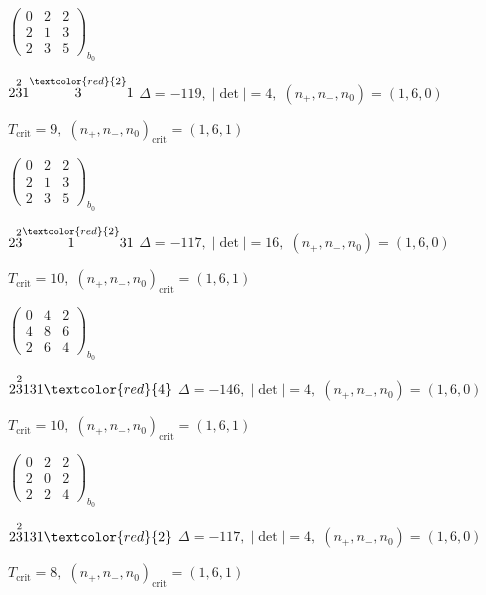 \documentclass[10pt]{article}
\begin{document}
\hspace{2em}$\left(\begin{smallmatrix}0 & 2 & 2 \\ 2 & 1 & 3 \\ 2 & 3 & 5\end{smallmatrix}\right)_{\!b_0}$

\smallskip

$2\overset{2}{3}1\overset{\textcolor{red}{2}}{3}1$ \quad $\Delta=-119,\; |\det|=4,\; (n_+,n_-,n_0)=(1,6,0)$

\hspace{1em}$T_{\text{crit}}=9,\; (n_+,n_-,n_0)_{\text{crit}}=(1,6,1)$

\hspace{2em}$\left(\begin{smallmatrix}0 & 2 & 2 \\ 2 & 1 & 3 \\ 2 & 3 & 5\end{smallmatrix}\right)_{\!b_0}$

$2\overset{2}{3}\overset{\textcolor{red}{2}}{1}31$ \quad $\Delta=-117,\; |\det|=16,\; (n_+,n_-,n_0)=(1,6,0)$

\hspace{1em}$T_{\text{crit}}=10,\; (n_+,n_-,n_0)_{\text{crit}}=(1,6,1)$

\hspace{2em}$\left(\begin{smallmatrix}0 & 4 & 2 \\ 4 & 8 & 6 \\ 2 & 6 & 4\end{smallmatrix}\right)_{\!b_0}$

$2\overset{2}{3}131\textcolor{red}{4}$ \quad $\Delta=-146,\; |\det|=4,\; (n_+,n_-,n_0)=(1,6,0)$

\hspace{1em}$T_{\text{crit}}=10,\; (n_+,n_-,n_0)_{\text{crit}}=(1,6,1)$

\hspace{2em}$\left(\begin{smallmatrix}0 & 2 & 2 \\ 2 & 0 & 2 \\ 2 & 2 & 4\end{smallmatrix}\right)_{\!b_0}$

$2\overset{2}{3}131\textcolor{red}{2}$ \quad $\Delta=-117,\; |\det|=4,\; (n_+,n_-,n_0)=(1,6,0)$

\hspace{1em}$T_{\text{crit}}=8,\; (n_+,n_-,n_0)_{\text{crit}}=(1,6,1)$
\end{document}
